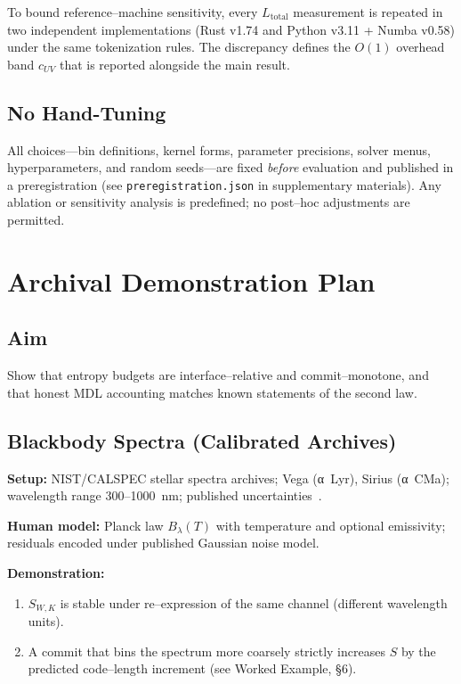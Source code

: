 \documentclass[11pt,letterpaper]{article}
\theoremstyle{definition}
\theoremstyle{remark}
\begin{document}
To bound reference--machine sensitivity, every \(L_{\mathrm{total}}\) measurement is repeated in two independent implementations (Rust v1.74 and Python v3.11 + Numba v0.58) under the same tokenization rules. The discrepancy defines the \(O(1)\) overhead band \(c_{UV}\) that is reported alongside the main result.

\subsection{No Hand-Tuning}

All choices---bin definitions, kernel forms, parameter precisions, solver menus, hyperparameters, and random seeds---are fixed \emph{before} evaluation and published in a preregistration (see \texttt{preregistration.json} in supplementary materials). Any ablation or sensitivity analysis is predefined; no post--hoc adjustments are permitted.

\section{Archival Demonstration Plan}

\subsection{Aim}

Show that entropy budgets are interface--relative and commit--monotone, and that honest MDL accounting matches known statements of the second law.

\subsection{Blackbody Spectra (Calibrated Archives)}

\textbf{Setup:} NIST/CALSPEC stellar spectra archives; Vega (α~Lyr), Sirius (α~CMa); wavelength range 300--1000~nm; published uncertainties~\cite{NIST_CALSPEC}.

\textbf{Human model:} Planck law \(B_\lambda(T)\) with temperature and optional emissivity; residuals encoded under published Gaussian noise model.

\textbf{Demonstration:}
\begin{enumerate}[label=(\alph*)]
  \item \(S_{W,K}\) is stable under re--expression of the same channel (different wavelength units).
  \item A commit that bins the spectrum more coarsely strictly increases \(S\) by the predicted code--length increment (see Worked Example, §6).
\end{enumerate}
\end{document}
